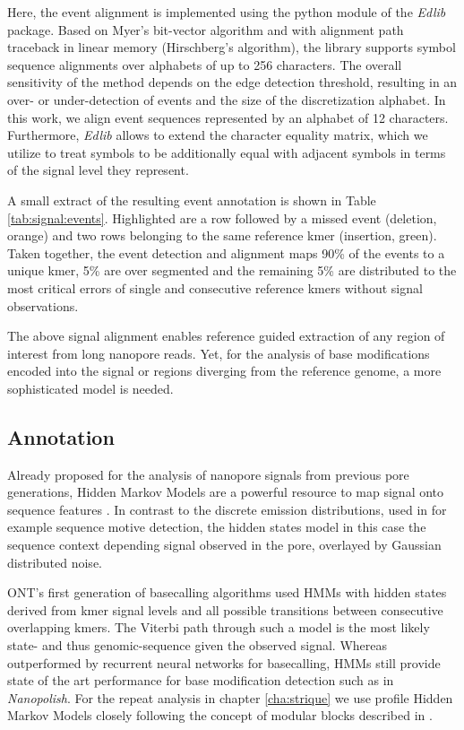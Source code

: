 Here, the event alignment is implemented using the python module of the \textit{Edlib} \cite{Sosic2017} package. Based on Myer's bit-vector algorithm and with alignment path traceback in linear memory (Hirschberg's algorithm), the library supports symbol sequence alignments over alphabets of up to 256 characters. 
The overall sensitivity of the method depends on the edge detection threshold, resulting in an over- or under-detection of events and the size of the discretization alphabet. 
In this work, we align event sequences represented by an alphabet of 12 characters. 
Furthermore, \textit{Edlib} allows to extend the character equality matrix, which we utilize to treat symbols to be additionally equal with adjacent symbols in terms of the signal level they represent.

A small extract of the resulting event annotation is shown in Table \ref{tab:signal:events}. Highlighted are a row followed by a missed event (deletion, orange) and two rows belonging to the same reference kmer (insertion, green). 
Taken together, the event detection and alignment maps 90\% of the events to a unique kmer, 5\% are over segmented and the remaining 5\% are distributed to the most critical errors of single and consecutive reference kmers without signal observations.

The above signal alignment enables reference guided extraction of any region of interest from long nanopore reads. Yet, for the analysis of base modifications encoded into the signal or regions diverging from the reference genome, a more sophisticated model is needed.




\subsection{Annotation}
\label{subsec:signal:annotation}

Already proposed for the analysis of nanopore signals from previous pore generations, Hidden Markov Models are a powerful resource to map signal onto sequence features \cite{Schreiber2015}. In contrast to the discrete emission distributions, used in for example sequence motive detection, the hidden states model in this case the sequence context depending signal observed in the pore, overlayed by Gaussian distributed noise.

ONT's first generation of basecalling algorithms used HMMs with hidden states derived from kmer signal levels and all possible transitions between consecutive overlapping kmers. 
The Viterbi path through such a model is the most likely state- and thus genomic-sequence given the observed signal. 
Whereas outperformed by recurrent neural networks for basecalling, HMMs still provide state of the art performance for base modification detection such as in \textit{Nanopolish}. 
For the repeat analysis in chapter \ref{cha:strique} we use profile Hidden Markov Models closely following the concept of modular blocks described in \cite{Schreiber2015}.

